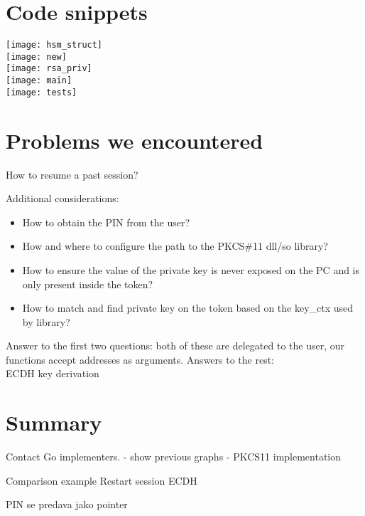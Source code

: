 \documentclass[a4paper]{scrartcl}
\begin{document}
\section{Code snippets}

\texttt{[image: hsm\_struct]}\\
\texttt{[image: new]}\\
\texttt{[image: rsa\_priv]}\\
\texttt{[image: main]}\\
\texttt{[image: tests]}

\section{Problems we encountered}
How to resume a past session?

Additional considerations:
\begin{itemize}
\item How to obtain the PIN from the user?
\item How and where to configure the path to the PKCS\#11 dll/so library?
\item How to ensure the value of the private key is never exposed on the PC and is only present inside the token?
\item How to match and find private key on the token based on the key\_ctx used by library?
\end{itemize}
Answer to the first two questions: both of these are delegated to the user, our functions accept addresses as arguments. %
Answers to the rest:\\

ECDH key derivation

\section{Summary}



Contact Go implementers.
 - show previous graphs
 - PKCS11 implementation


Comparison example
Restart session
ECDH

PIN se predava jako pointer
\end{document}
